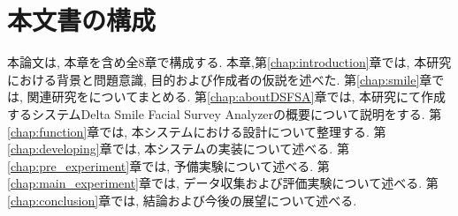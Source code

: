 \section{本文書の構成}

本論文は, 本章を含め全8章で構成する. 本章,第\ref{chap:introduction}章では, 本研究における背景と問題意識, 目的および作成者の仮説を述べた.
第\ref{chap:smile}章では, 関連研究をについてまとめる.
第\ref{chap:aboutDSFSA}章では, 本研究にて作成するシステムDelta Smile Facial Survey Analyzerの概要について説明をする.
第\ref{chap:function}章では, 本システムにおける設計について整理する.
第\ref{chap:developing}章では, 本システムの実装について述べる.
第\ref{chap:pre_experiment}章では, 予備実験について述べる.
第\ref{chap:main_experiment}章では, データ収集および評価実験について述べる.
第\ref{chap:conclusion}章では, 結論および今後の展望について述べる.
